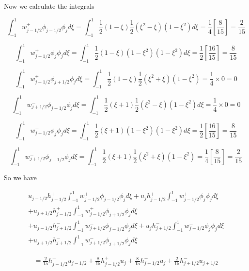 \documentclass[12pt]{article}
\begin{document}
Now we calculate the integrals

\[\int_{-1}^{1}w^+_{j-1/2}\phi_{j-1/2} \phi_{j} d\xi = \int_{-1}^{1}\frac{1}{2}\left(1 - \xi \right) \frac{1}{2}\left(\xi^2 - \xi\right) \left(1 - \xi^2\right) d\xi  = \frac{1}{4}\left[\frac{8}{15}\right] = \frac{2}{15}\]

\[\int_{-1}^{1} w^+_{j-1/2}\phi_{j} \phi_{j} d\xi =   \int_{-1}^{1}\frac{1}{2}\left(1 - \xi \right) \left(1 - \xi^2\right) \left(1 - \xi^2\right) d\xi = \frac{1}{2}\left[\frac{16}{15}\right] = \frac{8}{15}\]

\[\int_{-1}^{1} w^+_{j-1/2}\phi_{j+1/2} \phi_{j} d\xi = \int_{-1}^{1}\frac{1}{2}\left(1 - \xi \right) \frac{1}{2}\left(\xi^2 + \xi\right) \left(1 - \xi^2\right) = \frac{1}{4} \times  0 = 0\]

\[\int_{-1}^{1}w^-_{j+1/2}\phi_{j-1/2} \phi_{j} d\xi = \int_{-1}^{1}\frac{1}{2}\left(\xi  + 1 \right) \frac{1}{2}\left(\xi^2 - \xi\right) \left(1 - \xi^2\right) d\xi  = \frac{1}{4} \times  0 = 0 \]

\[\int_{-1}^{1} w^-_{j+1/2}\phi_{j} \phi_{j} d\xi =  \int_{-1}^{1}\frac{1}{2}\left(\xi + 1 \right) \left(1 - \xi^2\right) \left(1 - \xi^2\right) d\xi  = \frac{1}{2}\left[\frac{16}{15}\right] = \frac{8}{15}\]

\[\int_{-1}^{1} w^-_{j+1/2}\phi_{j+1/2} \phi_{j} d\xi =  \int_{-1}^{1}\frac{1}{2}\left(\xi  + 1 \right) \frac{1}{2}\left(\xi^2 + \xi\right) \left(1 - \xi^2\right) = \frac{1}{4}\left[\frac{8}{15}\right] = \frac{2}{15}\]

So we have 

\begin{multline*}
u_{j-1/2}h^+_{j-1/2}  \int_{-1}^{1}w^+_{j-1/2}\phi_{j-1/2} \phi_{j} d\xi + 
 u_{j}h^+_{j-1/2} \int_{-1}^{1} w^+_{j-1/2}\phi_{j} \phi_{j} d\xi  \\+
 u_{j+1/2}h^+_{j-1/2} \int_{-1}^{1} w^+_{j-1/2}\phi_{j+1/2} \phi_{j} d\xi \\+
 u_{j-1/2}h^-_{j+1/2}  \int_{-1}^{1}w^-_{j+1/2}\phi_{j-1/2} \phi_{j} d\xi + 
  u_{j}h^-_{j+1/2} \int_{-1}^{1} w^-_{j+1/2}\phi_{j} \phi_{j} d\xi  \\+
  u_{j+1/2}h^-_{j+1/2} \int_{-1}^{1} w^-_{j+1/2}\phi_{j+1/2} \phi_{j} d\xi
\end{multline*}


\begin{multline*}
 = \frac{2}{15} h^+_{j-1/2} u_{j-1/2}  +  \frac{8}{15}h^+_{j-1/2}u_{j}  +
  \frac{8}{15} h^-_{j+1/2} u_{j}  + \frac{2}{15}h^-_{j+1/2} u_{j+1/2} 
\end{multline*}
\end{document}
